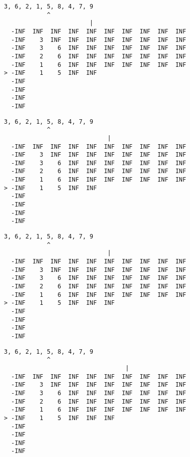 { \begin{verbatim}
3, 6, 2, 1, 5, 8, 4, 7, 9
            ^
                        |
  -INF  INF  INF  INF  INF  INF  INF  INF  INF  INF
  -INF    3  INF  INF  INF  INF  INF  INF  INF  INF
  -INF    3    6  INF  INF  INF  INF  INF  INF  INF
  -INF    2    6  INF  INF  INF  INF  INF  INF  INF
  -INF    1    6  INF  INF  INF  INF  INF  INF  INF
> -INF    1    5  INF  INF                         
  -INF                                             
  -INF                                             
  -INF                                             
  -INF                                             
\end{verbatim} }

{ \begin{verbatim}
3, 6, 2, 1, 5, 8, 4, 7, 9
            ^
                             |
  -INF  INF  INF  INF  INF  INF  INF  INF  INF  INF
  -INF    3  INF  INF  INF  INF  INF  INF  INF  INF
  -INF    3    6  INF  INF  INF  INF  INF  INF  INF
  -INF    2    6  INF  INF  INF  INF  INF  INF  INF
  -INF    1    6  INF  INF  INF  INF  INF  INF  INF
> -INF    1    5  INF  INF                         
  -INF                                             
  -INF                                             
  -INF                                             
  -INF                                             
\end{verbatim} }

{ \begin{verbatim}
3, 6, 2, 1, 5, 8, 4, 7, 9
            ^
                             |
  -INF  INF  INF  INF  INF  INF  INF  INF  INF  INF
  -INF    3  INF  INF  INF  INF  INF  INF  INF  INF
  -INF    3    6  INF  INF  INF  INF  INF  INF  INF
  -INF    2    6  INF  INF  INF  INF  INF  INF  INF
  -INF    1    6  INF  INF  INF  INF  INF  INF  INF
> -INF    1    5  INF  INF  INF                    
  -INF                                             
  -INF                                             
  -INF                                             
  -INF                                             
\end{verbatim} }

{ \begin{verbatim}
3, 6, 2, 1, 5, 8, 4, 7, 9
            ^
                                  |
  -INF  INF  INF  INF  INF  INF  INF  INF  INF  INF
  -INF    3  INF  INF  INF  INF  INF  INF  INF  INF
  -INF    3    6  INF  INF  INF  INF  INF  INF  INF
  -INF    2    6  INF  INF  INF  INF  INF  INF  INF
  -INF    1    6  INF  INF  INF  INF  INF  INF  INF
> -INF    1    5  INF  INF  INF                    
  -INF                                             
  -INF                                             
  -INF                                             
  -INF                                             
\end{verbatim} }

